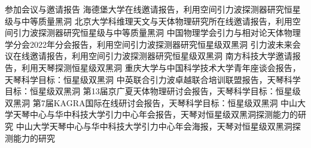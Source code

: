 
\begin{rubric}{参加会议与邀请报告}
    \entry*[2023] 海德堡大学在线邀请报告，利用空间引力波探测器研究恒星级与中等质量黑洞
    \entry*[2023] 北京大学科维理天文与天体物理研究所在线邀请报告，利用空间引力波探测器研究恒星级与中等质量黑洞
    \entry*[2022] 中国物理学会引力与相对论天体物理学分会2022年分会报告，利用空间引力波探测器研究恒星级双黑洞
    \entry*[2022] 引力波未来会议在线邀请报告，利用空间引力波探测器研究恒星级双黑洞
    \entry*[2022] 南方科技大学邀请报告，利用天琴探测恒星级双黑洞 
    \entry*[2021] 重庆大学与中国科学技术大学青年座谈会报告，天琴科学目标：恒星级双黑洞
    \entry*[2021] 中英联合引力波卓越联合培训联盟报告，天琴科学目标：恒星级双黑洞
    \entry*[2020] 第13届京广夏天体物理研讨会报告，天琴科学目标：恒星级双黑洞
    \entry*[2020] 第7届KAGRA国际在线研讨会报告，天琴科学目标：恒星级双黑洞
    \entry*[2019] 中山大学天琴中心与华中科技大学引力中心年会报告，天琴对恒星级双黑洞探测能力的研究 
    \entry*[2018] 中山大学天琴中心与华中科技大学引力中心年会海报，天琴对恒星级双黑洞探测能力的研究
\end{rubric}
